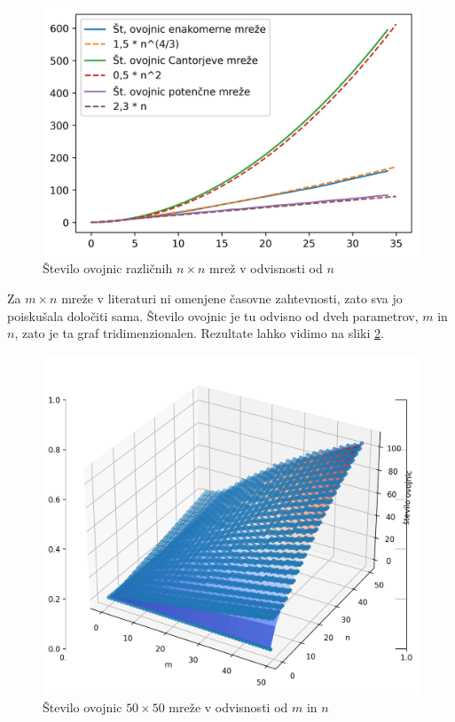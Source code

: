 \documentclass[a4paper]{article}
\begin{document}
\begin{figure}[!h]
	\centering
	\caption{Število ovojnic različnih $n \times n$ mrež v odvisnosti od $n$}
	\label{fig:st_ovojnic}
	\vspace{2mm}
	\includegraphics[scale=0.6]{slike/st_ovojnic.jpg}
\end{figure}

Za $m \times n$ mreže v literaturi ni omenjene časovne zahtevnosti, zato sva jo poiskušala določiti sama. Število ovojnic je tu odvisno od dveh parametrov, $m$ in $n$, zato je ta graf 
tridimenzionalen. Rezultate lahko vidimo na sliki \ref{fig:3d}.

\begin{figure}[!h]
	\centering
	\caption{Število ovojnic $50 \times 50$ mreže v odvisnosti od $m$ in $n$}
	\label{fig:3d}
	\vspace{2mm}
	\includegraphics[scale=0.4]{slike/mxn_3d.jpg}
\end{figure}
\end{document}

